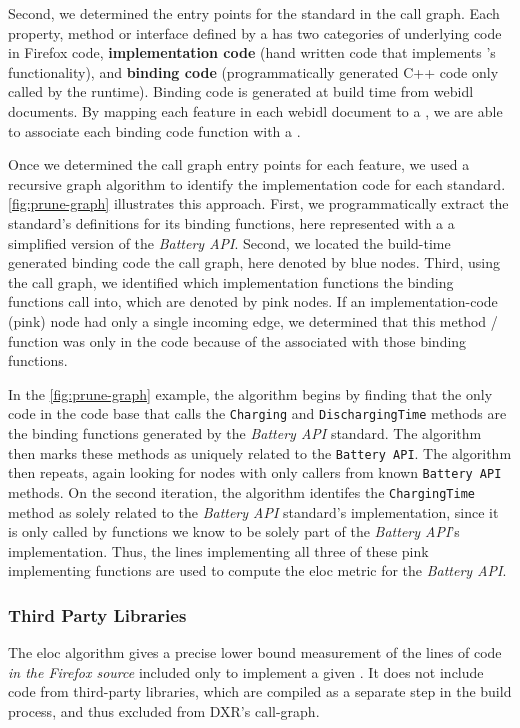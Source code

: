 Second, we determined the entry points for the standard in the call
graph.  Each property, method or interface defined by a \WAS has two categories
of underlying code in Firefox code, \textbf{implementation code}
(hand written code that implements \WAS's functionality), and \textbf{binding
code} (programmatically generated C++ code only called by the \JS runtime).
Binding code is generated at build time from \gls{webidl} documents. By
mapping each feature in each \gls{webidl} document to a \WAS, we are able to
associate each binding code function with a \WAS.



Once we determined the call graph entry points for each \WAPI feature, we used
a recursive graph algorithm to identify the implementation code for
each standard.  \ref{fig:prune-graph} illustrates this approach.  First, we
programmatically extract the standard's definitions for its binding functions,
here represented with a a simplified version of the \textit{Battery API}. Second,
we located the build-time generated binding code the \FF call graph, here
denoted by blue nodes.  Third, using the call graph, we identified which
implementation functions the binding functions call into, which are denoted by
pink nodes.  If an implementation-code (pink) node had only a single incoming edge,
we determined that this method / function was only in the code because of
the \WAS associated with those binding functions.

In the \ref{fig:prune-graph} example, the algorithm begins by finding that the
only code in the \FF code base that calls the \texttt{Charging} and
\texttt{DischargingTime} methods are the binding functions generated by the
\textit{Battery API} standard.  The algorithm then marks these methods as
uniquely related to the \texttt{Battery API}.  The algorithm then repeats,
again looking for nodes with only callers from known \texttt{Battery API}
methods.  On the second iteration, the algorithm identifes the
\texttt{ChargingTime} method as solely related to the \textit{Battery API}
standard's implementation, since it is only called by functions we know to be
solely part of the \textit{Battery API}'s implementation. Thus, the lines
implementing all three of these pink implementing functions are used to compute
the \gls{eloc} metric for the \textit{Battery API}.


\subsubsection{Third Party Libraries}
\label{cost-benefit:methodology:third-party-libraries}
The \gls{eloc} algorithm gives a precise lower bound measurement of the
lines of code \emph{in the Firefox source} included only to implement a given
\WAS.  It does not include code from third-party libraries, which are compiled
as a separate step in the \FF build process, and thus excluded from DXR's
call-graph.

